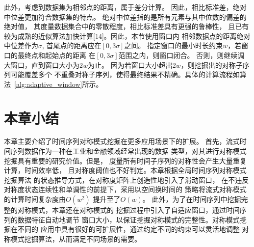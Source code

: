 此外，考虑到数据集为相邻点的距离，属于差分计算。
因此，相比标准差，绝对中位差更加符合数据集的特点。
绝对中位差指的是所有元素与其中位数的偏差的绝对值，
其度量数据集合中的零散程度，相比标准差具有更强的鲁棒性，
且已有较为成熟的近似算法加快计算[14]。因此，本节使用窗口内
相邻数据点的距离绝对中位差作为$\sigma$,
首尾点的距离应在$\left[0,3\sigma\right]$之间。
指定窗口的最小时长约束$w$，若窗口的最终点和起始点的距离
在$\left[0,3\sigma\right]$范围之内，则窗口闭合。
否则，则继续调大窗口，直到窗口大小为$2w$为止。
因为若窗口大小超出$2w$，则挖掘出的对称子序列可能覆盖多个
不重叠对称子序列，使得最终结果不精确。具体的计算流程如算法~\ref{alg:adaptive_window}所示。

\section{本章小结}
本章主要介绍了时间序列对称模式挖掘在更多应用场景下的扩展。
首先，流式时间序列数据作为一种在工业和金融领域经常出现的数据
类型，对其进行对称模式挖掘具有重要的研究价值。但是，
度量所有时间子序列的对称性会产生大量重复计算，时间效率低，
且对称度阈值也不好判定。本章根据全局时间序列对称模式挖掘算法
的状态推导方式，在对称度矩阵上创造性地引入了滑动窗口，
在不违反对称度状态连续性和单调性的前提下，采用以空间换时间的
策略将流式对称模式的计算时间复杂度由$O\left(w^2\right)$
提升至了$O\left(w\right)$。
此外，为了在时间序列中挖掘完整的对称模式，本章还在对称模式的
挖掘过程中引入了自适应窗口，通过时间序列的数据特征自动地调节
窗口大小，以保证挖掘对称模式的完整性。对称模式挖掘在不同的
应用中具有很好的可扩展性，通过约定不同的约束可以灵活地调整
对称模式挖掘算法，从而满足不同场景的需要。







